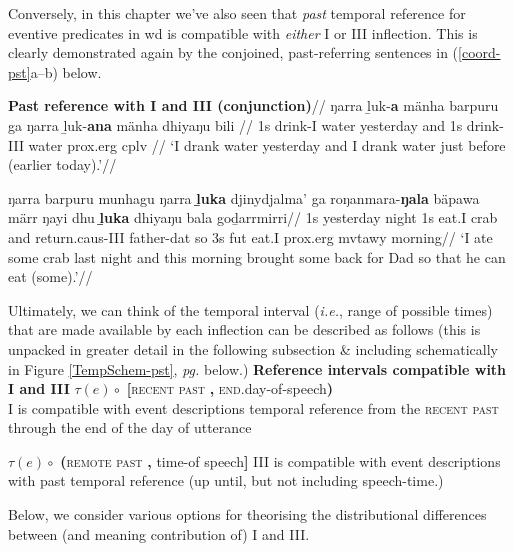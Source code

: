 Conversely, in this chapter we've also seen that \textit{past} temporal reference for eventive predicates in \gls{wd} is compatible with \textit{either} \gls{I} or \gls{III} inflection. This is clearly demonstrated again by the conjoined, past-referring sentences in (\ref{coord-pst}a--b) below.

\pex\glpreamble \textbf{Past reference with \gls{I} and \gls{III} (conjunction)}\label{coord-pst}//
\a\begingl\gla \nogloss{[} ŋarra ḻuk-\textbf{a} mänha barpuru \nogloss{]} ga \nogloss{[} ŋarra ḻuk-\textbf{ana} mänha dhiyaŋu bili \nogloss{]}//
\glb 1s drink-\gls{I} water yesterday and 1s drink-\gls{III} water \gls{prox}.\gls{erg} \gls{cplv} //
\glft`I drank water yesterday and I drank water just before (earlier today).'\trailingcitation{[DB~20190405]}//\endgl


\a\begingl\gla ŋarra barpuru munhagu ŋarra \textbf{ḻuka} djinydjalma' ga roŋanmara-\textbf{ŋala} bäpawa märr ŋayi dhu \textbf{ḻuka} dhiyaŋu bala goḏarrmirri//
\glb 1s yesterday night 1s eat.\gls{I} crab and return.\gls{caus}-\gls{III} father-\gls{dat} so 3s \gls{fut} eat.\gls{I} \gls{prox}.\gls{erg} \gls{mvtawy} morning//
\glft`I ate some crab last night and this morning brought some back for Dad so that he can eat (some).'\trailingcitation{[DB~20190416]}//\endgl

\xe



Ultimately, we can think of the temporal interval (\textit{i.e.}, range of possible times) that are made available by each inflection can be described as follows (this is unpacked in greater detail in the following subsection \& including schematically in Figure \ref{TempSchem-pst}, \textit{pg.} \pageref{TempSchem-pst} below.) 
\pex[labelformat=A] \textbf{Reference intervals compatible with \gls{I} and \gls{III}}
	\a[label=\textbf{\phantom{I}\gls{I}\phantom{I}}]$ \tau(e) \circ$ \textbf{[}\textsc{recent past} \textbf{,} \textsc{end}.day-of-speech\textbf{)}\\
	\gls{I} is compatible with event descriptions temporal reference from the \textsc{recent past} through the end of the day of utterance
	
	\a[label=\gls{III}]$ \tau(e) \circ$ \textbf{(}\textsc{remote past} \textbf{,} time-of speech\textbf{]} 
	\gls{III} is compatible with event descriptions with past temporal reference (up until, but not including speech-time.)
	
\xe

Below, we consider various options for theorising the distributional differences between (and meaning contribution of) \gls{I} and \gls{III}.

